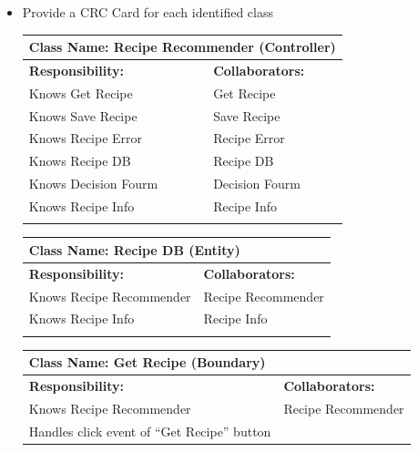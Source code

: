 \documentclass[]{article}
\begin{document}
\begin{itemize}
	\item Provide a CRC Card for each identified class
	\begin{table}[ht]
		\centering
		\begin{tabular}{|p{6cm}|p{6cm}|}
		\hline 
		\multicolumn{2}{|l|}{\textbf{Class Name: Recipe Recommender (Controller)}} \\
		\hline
		\textbf{Responsibility:} & \textbf{Collaborators:} \\
		\hline
		Knows Get Recipe & Get Recipe\\
		Knows Save Recipe & Save Recipe\\
		Knows Recipe Error & Recipe Error\\
		Knows Recipe DB & Recipe DB\\
		Knows Decision Fourm & Decision Fourm\\
		Knows Recipe Info & Recipe Info\\
		\vspace{1in} & \\
		\hline
		\end{tabular}
	\end{table}
	\begin{table}[ht]
		\centering
		\begin{tabular}{|p{6cm}|p{6cm}|}
		\hline 
		\multicolumn{2}{|l|}{\textbf{Class Name: Recipe DB (Entity)}} \\
		\hline
		\textbf{Responsibility:} & \textbf{Collaborators:} \\
		\hline
		Knows Recipe Recommender & Recipe Recommender \\
		Knows Recipe Info & Recipe Info \\
		\vspace{1in} & \\
		\hline
		\end{tabular}
	\end{table}
	\begin{table}[ht]
		\centering
		\begin{tabular}{|p{6cm}|p{6cm}|}
		\hline 
		\multicolumn{2}{|l|}{\textbf{Class Name: Get Recipe (Boundary)}} \\
		\hline
		\textbf{Responsibility:} & \textbf{Collaborators:} \\
		\hline
		Knows Recipe Recommender & Recipe Recommender \\
		Handles click event of “Get Recipe” button & \\  

\end{tabular}
\end{table}
\end{itemize}
\end{document}
